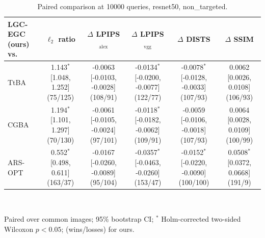 \begin{table}[t]
\centering\footnotesize
\caption{Paired comparison at 10000 queries, resnet50, non\_targeted.}
\begin{tabular}{lccccc}
\toprule
LGC-EGC (ours) vs. & $\ell_2$ ratio & $\Delta$ LPIPS$_{\mathrm{alex}}$ & $\Delta$ LPIPS$_{\mathrm{vgg}}$ & $\Delta$ DISTS & $\Delta$ SSIM \\
\midrule
TtBA & 1.143$^{*}$ [1.048, 1.252] (75/125) & -0.0063 [-0.0103, -0.0028] (108/91) & -0.0134$^{*}$ [-0.0200, -0.0077] (122/77) & -0.0078$^{*}$ [-0.0128, -0.0033] (107/93) & 0.0062 [0.0026, 0.0108] (106/93) \\
CGBA & 1.194$^{*}$ [1.101, 1.297] (70/130) & -0.0061 [-0.0105, -0.0024] (97/101) & -0.0118$^{*}$ [-0.0182, -0.0062] (109/91) & -0.0059 [-0.0106, -0.0018] (107/93) & 0.0064 [0.0028, 0.0109] (100/99) \\
ARS-OPT & 0.552$^{*}$ [0.498, 0.611] (163/37) & -0.0167 [-0.0260, -0.0089] (95/104) & -0.0357$^{*}$ [-0.0463, -0.0260] (153/47) & -0.0152$^{*}$ [-0.0220, -0.0090] (100/100) & 0.0508$^{*}$ [0.0372, 0.0668] (191/9) \\
\bottomrule
\end{tabular}
\\[2pt]\parbox{\linewidth}{\scriptsize Paired over common images; 95\% bootstrap CI; $^{*}$ Holm-corrected two-sided Wilcoxon $p<0.05$; (wins/losses) for ours.}
\end{table}
